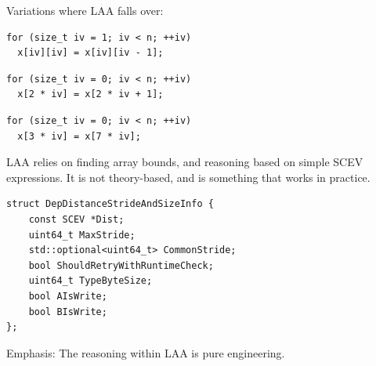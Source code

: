 \documentclass{beamer}
\begin{document}
\begin{frame}[containsverbatim]
  Variations where LAA falls over:

  \vspace{1em}

  \begin{verbatim}
for (size_t iv = 1; iv < n; ++iv)
  x[iv][iv] = x[iv][iv - 1];
  \end{verbatim}

  \vspace{1em}

  \begin{verbatim}
for (size_t iv = 0; iv < n; ++iv)
  x[2 * iv] = x[2 * iv + 1];
  \end{verbatim}

  \vspace{1em}

  \begin{verbatim}
for (size_t iv = 0; iv < n; ++iv)
  x[3 * iv] = x[7 * iv];
  \end{verbatim}

  \vspace{1em}

  LAA relies on finding array bounds, and reasoning based on simple SCEV expressions. It is not theory-based, and is something that works in practice.
\end{frame}

\begin{frame}[containsverbatim]
  \begin{verbatim}
struct DepDistanceStrideAndSizeInfo {
    const SCEV *Dist;
    uint64_t MaxStride;
    std::optional<uint64_t> CommonStride;
    bool ShouldRetryWithRuntimeCheck;
    uint64_t TypeByteSize;
    bool AIsWrite;
    bool BIsWrite;
};
  \end{verbatim}

  \vspace{1em}

  Emphasis: The reasoning within LAA is pure engineering.
\end{frame}
\end{document}
